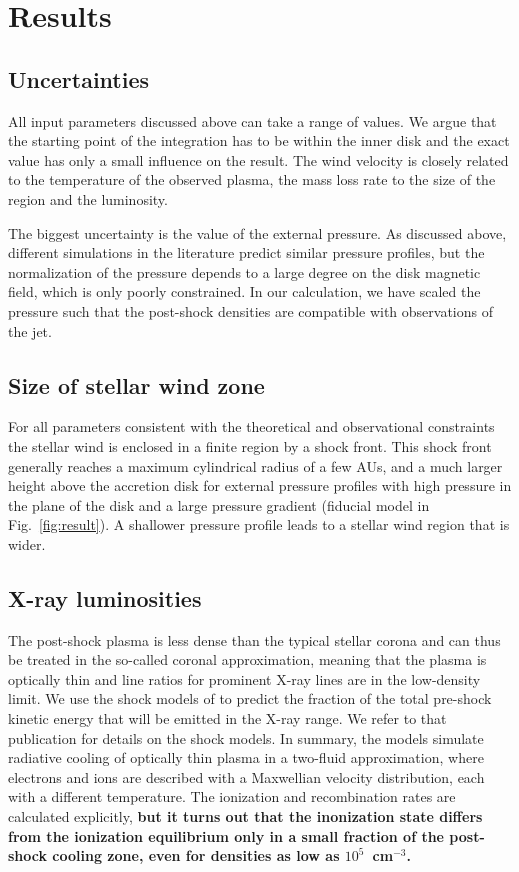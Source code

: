 \section{Results}
\label{sect:results}

\subsection{Uncertainties}
All input parameters discussed above can take a range of values. We argue that the starting point of the integration has to be within the inner disk and the exact value has only a small influence on the result. The wind velocity is closely related to the temperature of the observed plasma, the mass loss rate to the size of the region and the luminosity.

The biggest uncertainty is the value of the external pressure. As discussed above, different simulations in the literature predict similar pressure profiles, but the normalization of the pressure depends to a large degree on the disk magnetic field, which is only poorly constrained. In our calculation, we have scaled the pressure such that the post-shock densities are compatible with observations of the jet.


\subsection{Size of stellar wind zone}
For all parameters consistent with the theoretical and observational constraints the stellar wind is enclosed in a finite region by a shock front. This shock front generally reaches a maximum cylindrical radius of a few AUs, and a much larger height above the accretion disk for external pressure profiles with high pressure in the plane of the disk and a large pressure gradient (fiducial model in Fig.~\ref{fig:result}). A shallower pressure profile leads to a stellar wind region that is wider. 

\subsection{X-ray luminosities}
\label{sect:LX}
The post-shock plasma is less dense than the typical stellar corona and can thus be treated in the so-called coronal approximation, meaning that the plasma is optically thin and line ratios for prominent X-ray lines are in the low-density limit. We use the shock models of \citet{2007A&A...466.1111G} to predict the fraction of the total pre-shock kinetic energy that will be emitted in the X-ray range. We refer to that publication for details on the shock models. In summary, the models simulate radiative cooling of optically thin plasma in a two-fluid approximation, where electrons and ions are described with a Maxwellian velocity distribution, each with a different temperature. The ionization and recombination rates are calculated explicitly, \textbf{ but it turns out that the inonization state differs from the ionization equilibrium only in a small fraction of the post-shock cooling zone, even for densities as low as $10^5$~cm$^{-3}$.}


